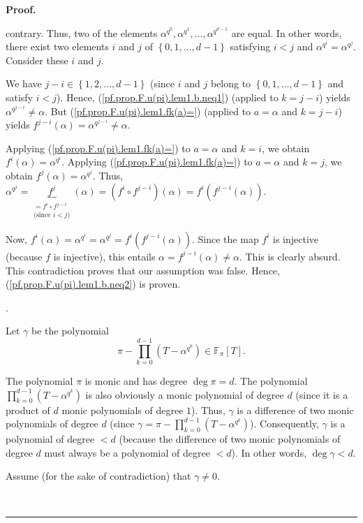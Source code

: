 \documentclass[numbers=enddot,12pt,final,onecolumn,notitlepage]{scrartcl}%
\theoremstyle{definition}
\newenvironment{proof}[1][Proof]{\noindent\textbf{#1.} }{\ \rule{0.5em}{0.5em}}
\let\prodnonlimits\prod
\renewcommand{\prod}{\prodnonlimits\limits}
\begin{document}
\begin{proof}
{contrary. Thus, two of the elements $\alpha^{q^{0}},\alpha^{q^{1}}%
,\ldots,\alpha^{q^{d-1}}$ are equal. In other words, there exist two elements
$i$ and $j$ of $\left\{  0,1,\ldots,d-1\right\}  $ satisfying $i<j$ and
$\alpha^{q^{i}}=\alpha^{q^{j}}$. Consider these $i$ and $j$.
\par
We have $j-i\in\left\{  1,2,\ldots,d-1\right\}  $ (since $i$ and $j$ belong to
$\left\{  0,1,\ldots,d-1\right\}  $ and satisfy $i<j$). Hence,
(\ref{pf.prop.F.u(pi).lem1.b.neq1}) (applied to $k=j-i$) yields $\alpha
^{q^{j-i}}\neq\alpha$. But (\ref{pf.prop.F.u(pi).lem1.fk(a)=}) (applied to
$a=\alpha$ and $k=j-i$) yields $f^{j-i}\left(  \alpha\right)  =\alpha
^{q^{j-i}}\neq\alpha$.
\par
Applying (\ref{pf.prop.F.u(pi).lem1.fk(a)=}) to $a=\alpha$ and $k=i$, we
obtain $f^{i}\left(  \alpha\right)  =\alpha^{q^{i}}$. Applying
(\ref{pf.prop.F.u(pi).lem1.fk(a)=}) to $a=\alpha$ and $k=j$, we obtain
$f^{j}\left(  \alpha\right)  =\alpha^{q^{j}}$. Thus, $\alpha^{q^{j}%
}=\underbrace{f^{j}}_{\substack{=f^{i}\circ f^{j-i}\\\text{(since }%
i<j\text{)}}}\left(  \alpha\right)  =\left(  f^{i}\circ f^{j-i}\right)
\left(  \alpha\right)  =f^{i}\left(  f^{j-i}\left(  \alpha\right)  \right)  $.
\par
Now, $f^{i}\left(  \alpha\right)  =\alpha^{q^{i}}=\alpha^{q^{j}}=f^{i}\left(
f^{j-i}\left(  \alpha\right)  \right)  $. Since the map $f^{i}$ is injective
(because $f$ is injective), this entails $\alpha=f^{j-i}\left(  \alpha\right)
\neq\alpha$. This is clearly absurd. This contradiction proves that our
assumption was false. Hence, (\ref{pf.prop.F.u(pi).lem1.b.neq2}) is proven.}.

Let $\gamma$ be the polynomial%
\[
\pi-\prod_{k=0}^{d-1}\left(  T-\alpha^{q^{k}}\right)  \in\mathbb{F}_{\pi
}\left[  T\right]  .
\]


The polynomial $\pi$ is monic and has degree $\deg\pi=d$. The polynomial
$\prod_{k=0}^{d-1}\left(  T-\alpha^{q^{k}}\right)  $ is also obviously a monic
polynomial of degree $d$ (since it is a product of $d$ monic polynomials of
degree $1$). Thus, $\gamma$ is a difference of two monic polynomials of degree
$d$ (since $\gamma=\pi-\prod_{k=0}^{d-1}\left(  T-\alpha^{q^{k}}\right)  $).
Consequently, $\gamma$ is a polynomial of degree $<d$ (because the difference
of two monic polynomials of degree $d$ must always be a polynomial of degree
$<d$). In other words, $\deg\gamma<d$.

Assume (for the sake of contradiction) that $\gamma\neq0$.


\end{proof}
\end{document}
